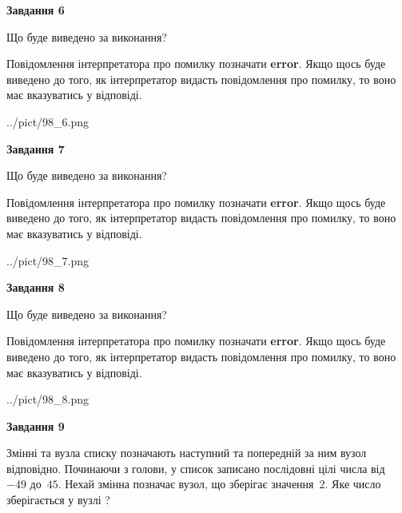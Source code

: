\documentclass[12pt, ukrainian]{article}
\begin{document}
{\begin {large}
{\begin {center}\textbf{Завдання 6}\end {center}}\par
Що буде виведено за виконання?

Повідомлення інтерпретатора про помилку позначати \textbf{error}.
Якщо щось буде виведено до того, як інтерпретатор видасть повідомлення про помилку, 
то воно має вказуватись у відповіді. \par


\begin{center}
	{../pict/98_6.png}
\end{center}
\newpage

{\begin {center}\textbf{Завдання 7}\end {center}}\par
Що буде виведено за виконання?

Повідомлення інтерпретатора про помилку позначати \textbf{error}.
Якщо щось буде виведено до того, як інтерпретатор видасть повідомлення про помилку, 
то воно має вказуватись у відповіді. \par


\begin{center}
	{../pict/98_7.png}
\end{center}
\newpage

{\begin {center}\textbf{Завдання 8}\end {center}}\par
Що буде виведено за виконання?

Повідомлення інтерпретатора про помилку позначати \textbf{error}.
Якщо щось буде виведено до того, як інтерпретатор видасть повідомлення про помилку, 
то воно має вказуватись у відповіді. \par


\begin{center}
	{../pict/98_8.png}
\end{center}
\newpage

{\begin {center}\textbf{Завдання 9}\end {center}}\par
Змінні  та  вузла списку позначають наступний та попередній за ним вузол відповідно. Починаючи з голови, у список записано послідовні цілі числа від~$-49$ до~$45$. Нехай змінна  позначає вузол, що зберігає значення~$2$.
Яке число зберігається у вузлі  ?\par
\newpage


\end{large}}
\end{document}
